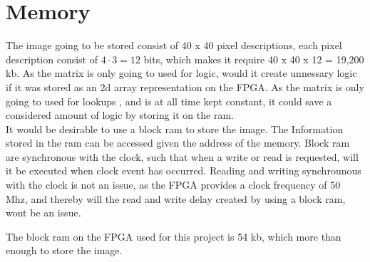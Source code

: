 \section{Memory}
The image going to be stored consist of 40 x 40 pixel descriptions, each pixel description consist of $4 \cdot 3 = 12$ bits,  which makes it require 40 x 40 x 12   =  19,200 kb.  As the matrix is only going to used for logic, would it create unnessary logic if it was stored as an 2d array representation on the FPGA. As the matrix is only going to used for lookups , and is at all time kept constant, it could save a considered amount of logic by storing it on the ram. 	\\
It would be desirable to use a block ram to store the image.  The Information stored in the ram can be accessed given the address of the memory. Block ram are synchronous with the clock, such that when a write or read is requested, will it be executed when clock event has occurred. Reading and writing synchrounous with the clock is not an issue, as the FPGA provides a clock frequency of 50 Mhz, and thereby will the read and write delay created by using a block ram, wont be an issue. 

The block ram on the FPGA used for this project is 54 kb, which more than enough to store the image. \cite{FPGA}


